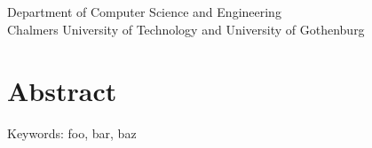 
\makeatletter
\noindent\oneLineTitle\\
\@author\\
Department of Computer Science and Engineering\\
Chalmers University of Technology and University of Gothenburg

\thispagestyle{plain}			%
\setlength{\parindent}{1.5em}
\section*{Abstract}

\lipsum[1-2]

\vfill
Keywords: foo, bar, baz

\newpage				%
\thispagestyle{empty}
\mbox{}
\makeatother
